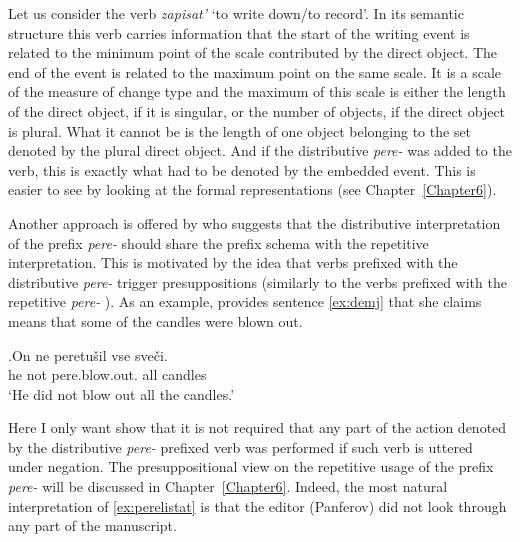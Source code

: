 Let us consider the verb \textit{zapisat'} `to write down/to record'. In its semantic structure this verb carries information that the start of the writing event is related to the minimum point of the scale contributed by the direct object. The end of the event is related to the maximum point on the same scale. It is a scale of the measure of change type and the maximum of this scale is either the length of the direct object, if it is singular, or the number of objects, if the direct object is plural. What it cannot be is the length of one object belonging to the set denoted by the plural direct object. And if the distributive  \textit{pere-}   was added to the verb, this is exactly what had to be denoted by the embedded event. This is easier to see by looking at the formal representations (see Chapter~\ref{Chapter6}).

Another approach is offered by \citet{Demjjanow:97} who suggests that the distributive  interpretation of the prefix \textit{pere-}   should share the prefix schema with the repetitive  interpretation. This is motivated by the idea that verbs prefixed with the distributive  \textit{pere-}   trigger presuppositions (similarly to the verbs prefixed with the repetitive  \textit{pere-}  ). As an example, \citet{Demjjanow:97} provides sentence \ref{ex:demj} that she claims means that some of the candles were blown out.

\exg.\label{ex:demj}On ne peretu\v{s}il vse sve\v{c}i.\\
he not pere.blow.out. all candles\\
\trans `He did not blow out all the candles.'\\

Here I only want show that it is not required that any part of the action denoted by the distributive  \textit{pere-}  prefixed verb was performed if such verb is uttered under negation. The presuppositional view on the repetitive  usage of the prefix \textit{pere-}   will be discussed in Chapter~\ref{Chapter6}. Indeed, the most natural interpretation of \ref{ex:perelistat} is that the editor (Panferov) did not look through any part of the manuscript.

